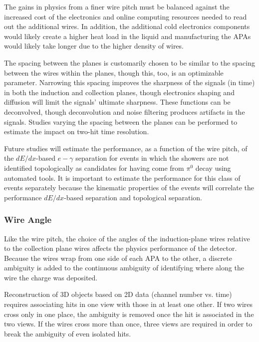 The gains in physics from a finer wire pitch must be balanced against
the increased cost of the electronics and online computing resources
needed to read out the additional wires.  In addition, the additional
cold electronics components would likely create a higher heat load in
the liquid and manufacturing the APAs would likely take longer due to
the higher density of wires.

The spacing between the planes is customarily chosen to be similar to
the spacing between the wires within the planes, though this, too, is
an optimizable parameter.  Narrowing this spacing improves the
sharpness of the signals (in time) in both the induction and
collection planes, though electronics shaping and diffusion will limit
the signals' ultimate sharpness.  These functions can be deconvolved,
though deconvolution and noise filtering produces artifacts in the
signals.  Studies varying the spacing between the planes can be
performed to estimate the impact on two-hit time resolution.

Future studies will estimate the performance, as a function of the wire pitch,
of the $dE/dx$-based $e-\gamma$ separation for events in which
the showers are not identified topologically as candidates for having
come from $\pi^0$ decay using automated tools.   It is important to estimate the
performance for this class of events separately 
because the kinematic properties of the events will correlate
the performance $dE/dx$-based separation and topological
separation.  

\subsubsection{Wire Angle}
\label{v4:fd-ref-wireangle}

Like the wire pitch, the choice of the angles of the induction-plane
wires relative to the collection plane wires affects the physics
performance of the detector.  Because the wires wrap from one side of
each APA to the other, a discrete ambiguity is added to the
continuous ambiguity of identifying where along the wire the charge was deposited.

Reconstruction of 3D objects based on 2D data (channel number
vs. time) requires associating hits in one view with those in at least
one other.  If two wires cross only in one place, the ambiguity is
removed once the hit is associated in the two views.  If the wires
cross more than once, three views are required in order to break the
ambiguity of even isolated hits.

